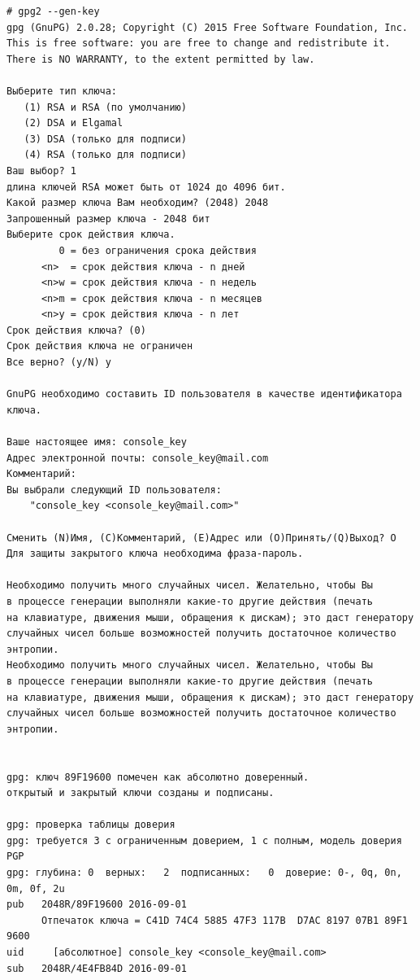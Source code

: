 \begin{verbatim}  
# gpg2 --gen-key
gpg (GnuPG) 2.0.28; Copyright (C) 2015 Free Software Foundation, Inc.
This is free software: you are free to change and redistribute it.
There is NO WARRANTY, to the extent permitted by law.

Выберите тип ключа:
   (1) RSA и RSA (по умолчанию)
   (2) DSA и Elgamal
   (3) DSA (только для подписи)
   (4) RSA (только для подписи)
Ваш выбор? 1
длина ключей RSA может быть от 1024 до 4096 бит.
Какой размер ключа Вам необходим? (2048) 2048
Запрошенный размер ключа - 2048 бит
Выберите срок действия ключа.
         0 = без ограничения срока действия
      <n>  = срок действия ключа - n дней
      <n>w = срок действия ключа - n недель
      <n>m = срок действия ключа - n месяцев
      <n>y = срок действия ключа - n лет
Срок действия ключа? (0) 
Срок действия ключа не ограничен
Все верно? (y/N) y

GnuPG необходимо составить ID пользователя в качестве идентификатора ключа.

Ваше настоящее имя: console_key
Адрес электронной почты: console_key@mail.com
Комментарий: 
Вы выбрали следующий ID пользователя:
    "console_key <console_key@mail.com>"

Сменить (N)Имя, (C)Комментарий, (E)Адрес или (O)Принять/(Q)Выход? O
Для защиты закрытого ключа необходима фраза-пароль.

Необходимо получить много случайных чисел. Желательно, чтобы Вы
в процессе генерации выполняли какие-то другие действия (печать
на клавиатуре, движения мыши, обращения к дискам); это даст генератору
случайных чисел больше возможностей получить достаточное количество энтропии.
Необходимо получить много случайных чисел. Желательно, чтобы Вы
в процессе генерации выполняли какие-то другие действия (печать
на клавиатуре, движения мыши, обращения к дискам); это даст генератору
случайных чисел больше возможностей получить достаточное количество энтропии.


gpg: ключ 89F19600 помечен как абсолютно доверенный.
открытый и закрытый ключи созданы и подписаны.

gpg: проверка таблицы доверия
gpg: требуется 3 с ограниченным доверием, 1 с полным, модель доверия PGP
gpg: глубина: 0  верных:   2  подписанных:   0  доверие: 0-, 0q, 0n, 0m, 0f, 2u
pub   2048R/89F19600 2016-09-01
      Отпечаток ключа = C41D 74C4 5885 47F3 117B  D7AC 8197 07B1 89F1 9600
uid     [абсолютное] console_key <console_key@mail.com>
sub   2048R/4E4FB84D 2016-09-01


\end{verbatim}
